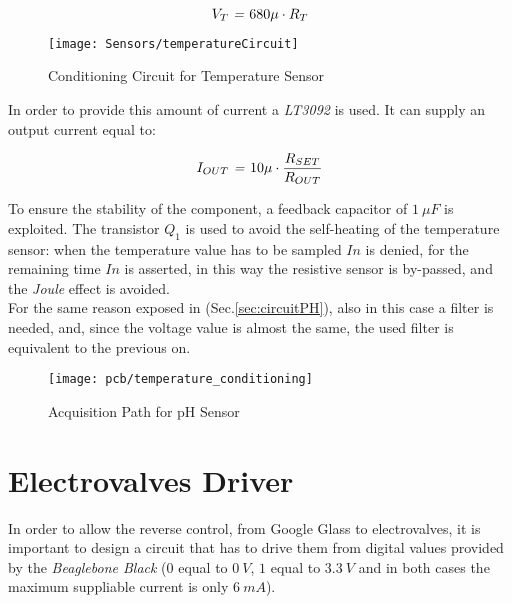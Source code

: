 \begin{equation}
V_T \text{ \textit{=} } 680 \mu \cdot R_T
\end{equation}

\begin{figure}[h]
	\begin{center}
		\texttt{[image: Sensors/temperatureCircuit]}
		\caption{Conditioning Circuit for Temperature Sensor}
		\label{Fig:temperatureCircuit}
	\end{center}
\end{figure}

In order to provide this amount of current a \textit{LT3092} is used. It can supply an output current equal to:

\begin{equation}
I_{OUT} \text{\textit{ = }} 10\mu \cdot \frac{R_{SET}}{R_{OUT}}
\end{equation}

To ensure the stability of the component, a feedback capacitor of $1\ \mu F$ is exploited. The transistor $Q_1$ is used to avoid the self-heating of the temperature sensor: when the temperature value has to be sampled $In$ is denied, for the remaining time $In$ is asserted, in this way the resistive sensor is by-passed, and the \textit{Joule} effect is avoided.\\

For the same reason exposed in (Sec.\ref{sec:circuitPH}), also in this case a filter is needed, and, since the voltage value is almost the same, the used filter is equivalent to the previous on.\\

\begin{figure}[h]
	\centering
	\texttt{[image: pcb/temperature\_conditioning]}
	\caption{Acquisition Path for pH Sensor}
	\label{Fig:temperatureConditioning}
\end{figure}

 
\section{Electrovalves Driver} \label{sec:electrovalves}

In order to allow the reverse control, from Google Glass to electrovalves, it is important to design a circuit that has to drive them from digital values provided by the \textit{Beaglebone Black} ($0$ equal to $0\ V$, $1$ equal to $3.3\ V$ and in both cases the maximum suppliable current is only $6\ mA$).\\

